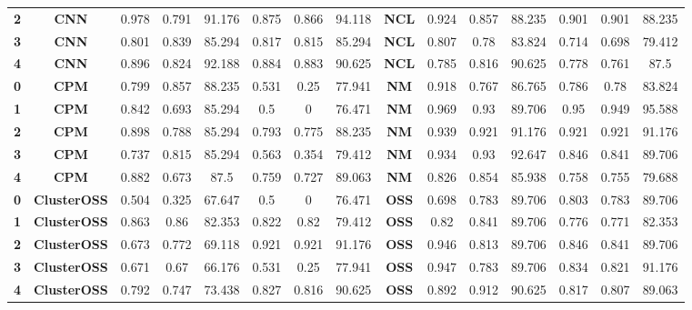 {{\begin{tabular}{c|c|cccccc|ccccccc}
\textbf{2} & \textbf{CNN} & 0.978 & 0.791 & 91.176 & 0.875 & 0.866 & 94.118 & \multicolumn{1}{c|}{\textbf{NCL}} & 0.924 & 0.857 & 88.235 & 0.901 & 0.901 & 88.235 \\
\textbf{3} & \textbf{CNN} & 0.801 & 0.839 & 85.294 & 0.817 & 0.815 & 85.294 & \multicolumn{1}{c|}{\textbf{NCL}} & 0.807 & 0.78  & 83.824 & 0.714 & 0.698 & 79.412 \\
\textbf{4} & \textbf{CNN} & 0.896 & 0.824 & 92.188 & 0.884 & 0.883 & 90.625 & \multicolumn{1}{c|}{\textbf{NCL}} & 0.785 & 0.816 & 90.625 & 0.778 & 0.761 & 87.5 \\
\textbf{0} & \textbf{CPM} & 0.799 & 0.857 & 88.235 & 0.531 & 0.25  & 77.941 & \multicolumn{1}{c|}{\textbf{NM}} & 0.918 & 0.767 & 86.765 & 0.786 & 0.78  & 83.824 \\
\textbf{1} & \textbf{CPM} & 0.842 & 0.693 & 85.294 & 0.5   & 0     & 76.471 & \multicolumn{1}{c|}{\textbf{NM}} & 0.969 & 0.93  & 89.706 & 0.95  & 0.949 & 95.588 \\
\textbf{2} & \textbf{CPM} & 0.898 & 0.788 & 85.294 & 0.793 & 0.775 & 88.235 & \multicolumn{1}{c|}{\textbf{NM}} & 0.939 & 0.921 & 91.176 & 0.921 & 0.921 & 91.176 \\
\textbf{3} & \textbf{CPM} & 0.737 & 0.815 & 85.294 & 0.563 & 0.354 & 79.412 & \multicolumn{1}{c|}{\textbf{NM}} & 0.934 & 0.93  & 92.647 & 0.846 & 0.841 & 89.706 \\
\textbf{4} & \textbf{CPM} & 0.882 & 0.673 & 87.5  & 0.759 & 0.727 & 89.063 & \multicolumn{1}{c|}{\textbf{NM}} & 0.826 & 0.854 & 85.938 & 0.758 & 0.755 & 79.688 \\
\textbf{0} & \textbf{ClusterOSS} & 0.504 & 0.325 & 67.647 & 0.5   & 0     & 76.471 & \multicolumn{1}{c|}{\textbf{OSS}} & 0.698 & 0.783 & 89.706 & 0.803 & 0.783 & 89.706 \\
\textbf{1} & \textbf{ClusterOSS} & 0.863 & 0.86  & 82.353 & 0.822 & 0.82  & 79.412 & \multicolumn{1}{c|}{\textbf{OSS}} & 0.82  & 0.841 & 89.706 & 0.776 & 0.771 & 82.353 \\
\textbf{2} & \textbf{ClusterOSS} & 0.673 & 0.772 & 69.118 & 0.921 & 0.921 & 91.176 & \multicolumn{1}{c|}{\textbf{OSS}} & 0.946 & 0.813 & 89.706 & 0.846 & 0.841 & 89.706 \\
\textbf{3} & \textbf{ClusterOSS} & 0.671 & 0.67  & 66.176 & 0.531 & 0.25  & 77.941 & \multicolumn{1}{c|}{\textbf{OSS}} & 0.947 & 0.783 & 89.706 & 0.834 & 0.821 & 91.176 \\
\textbf{4} & \textbf{ClusterOSS} & 0.792 & 0.747 & 73.438 & 0.827 & 0.816 & 90.625 & \multicolumn{1}{c|}{\textbf{OSS}} & 0.892 & 0.912 & 90.625 & 0.817 & 0.807 & 89.063 \\

\end{tabular}}}
